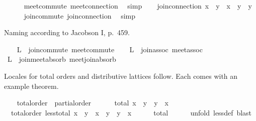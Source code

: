 \begin{isabellebody}
\ \ \ \ \isamarkupfalse%
\ meet{\isacharunderscore}commute\ meet{\isacharunderscore}connection\ \isamarkupfalse%
\ simp\isanewline
\isanewline
\ \ \isamarkupfalse%
\ join{\isacharunderscore}connection{}{\isacharcolon}\ {\isachardoublequoteopen}{\isacharparenleft}x\ {\isasymsqsubseteq}\ y{\isacharparenright}\ {\isacharequal}\ {\isacharparenleft}x\ {\isasymsqunion}\ y\ {\isacharequal}\ y{\isacharparenright}{\isachardoublequoteclose}\isanewline
\ \ \ \ \isamarkupfalse%
\ join{\isacharunderscore}commute\ join{\isacharunderscore}connection\ \isamarkupfalse%
\ simp%
\begin{isamarkuptext}%
Naming according to Jacobson I, p.\ 459.%
\end{isamarkuptext}%
\isamarkuptrue%
\ \ \isamarkupfalse%
\ L{}\ {\isacharequal}\ join{\isacharunderscore}commute\ meet{\isacharunderscore}commute\isanewline
\ \ \isamarkupfalse%
\ L{}\ {\isacharequal}\ join{\isacharunderscore}assoc\ meet{\isacharunderscore}assoc\isanewline
\ \ \isanewline
\ \ \isamarkupfalse%
\ L{}\ {\isacharequal}\ join{\isacharunderscore}meet{\isacharunderscore}absorb\ meet{\isacharunderscore}join{\isacharunderscore}absorb%
\endisataginvisible
{\isafoldinvisible}%
%
\isadeliminvisible
\isanewline
%
\endisadeliminvisible
\isanewline
\ \ \isamarkupfalse%
%
\begin{isamarkuptext}%
Locales for total orders and distributive lattices follow.
  Each comes with an example theorem.%
\end{isamarkuptext}%
\isamarkuptrue%
\ \ \isamarkupfalse%
\ total{\isacharunderscore}order\ {\isacharequal}\ partial{\isacharunderscore}order\ {\isacharplus}\isanewline
\ \ \ \ \ total{\isacharcolon}\ {\isachardoublequoteopen}x\ {\isasymsqsubseteq}\ y\ {\isasymor}\ y\ {\isasymsqsubseteq}\ x{\isachardoublequoteclose}\isanewline
\isanewline
\ \ \isamarkupfalse%
\ {\isacharparenleft}\ total{\isacharunderscore}order{\isacharparenright}\ less{\isacharunderscore}total{\isacharcolon}\ {\isachardoublequoteopen}x\ {\isasymsqsubset}\ y\ {\isasymor}\ x\ {\isacharequal}\ y\ {\isasymor}\ y\ {\isasymsqsubset}\ x{\isachardoublequoteclose}\isanewline
%
\isadelimproof
\ \ \ \ %
\endisadelimproof
%
\isatagproof
{}\isamarkupfalse%
\ total\isanewline
\ \ \ \ \isamarkupfalse%
\ {\isacharparenleft}unfold\ less{\isacharunderscore}def{\isacharparenright}\ blast%

\end{isabellebody}
